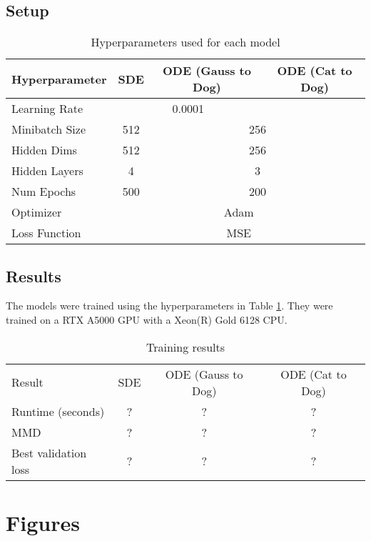 \documentclass[conference,a4paper]{IEEEtran}
\begin{document}
\subsection{Setup}
\begin{table}
    \caption{Hyperparameters used for each model}
    \label{tab:hyp}
    \centering
    \begin{tabular}{lccc}
        \toprule
        Hyperparameter & SDE & ODE (Gauss to Dog) & ODE (Cat to Dog) \\
        \midrule
        Learning Rate & \multicolumn{2}{c}{0.0001} \\
        Minibatch Size & 512 & \multicolumn{2}{c}{256} \\
        Hidden Dims & 512 & \multicolumn{2}{c}{256}\\
        Hidden Layers & 4 & \multicolumn{2}{c}{3} \\
        Num Epochs & 500 & \multicolumn{2}{c}{200}\\
        Optimizer & \multicolumn{3}{c}{Adam} \\
        Loss Function & \multicolumn{3}{c}{MSE} \\
        \midrule
        \bottomrule
    \end{tabular}
\end{table}

\subsection{Results}
The models were trained using the hyperparameters in Table \ref{tab:hyp}. They were trained on a RTX A5000 GPU with a Xeon(R) Gold 6128 CPU. 
\begin{table}
    \caption{Training results}
    \label{tab:mmd}
    \centering
    \begin{tabular}{lccc}
        \toprule
        Result & SDE & ODE (Gauss to Dog) & ODE (Cat to Dog) \\
        Runtime (seconds) & ? & ? & ? \\
        MMD & ? & ? & ? \\
        Best validation loss & ? & ? & ? \\
        \midrule
        \bottomrule
    \end{tabular}
\end{table}

\section{Figures}
\end{document}
